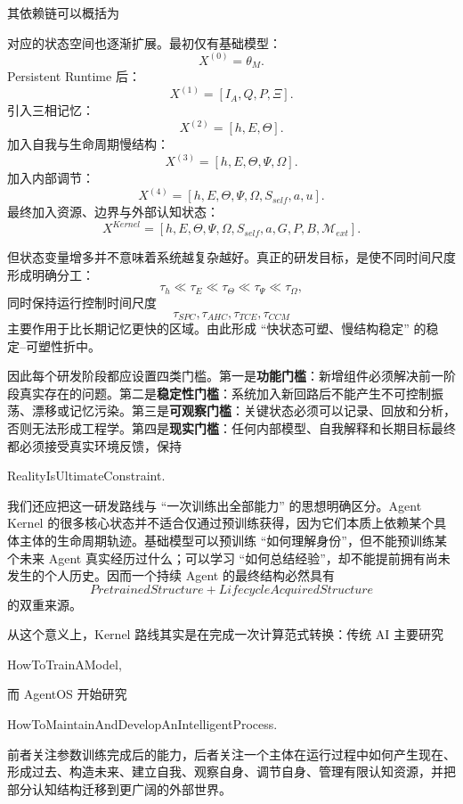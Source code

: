 其依赖链可以概括为
\begin{statementbox}
\centering
{}
\end{statementbox}

对应的状态空间也逐渐扩展。最初仅有基础模型：
\[
X^{(0)}=\theta_M.
\]
Persistent Runtime 后：
\[
X^{(1)}
=
[I_A,Q,P,\Xi].
\]
引入三相记忆：
\[
X^{(2)}
=
[h,E,\Theta].
\]
加入自我与生命周期慢结构：
\[
X^{(3)}
=
[h,E,\Theta,\Psi,\Omega].
\]
加入内部调节：
\[
X^{(4)}
=
[h,E,\Theta,\Psi,\Omega,S_{self},a,u].
\]
最终加入资源、边界与外部认知状态：
\[
X^{Kernel}
=
[
h,E,\Theta,\Psi,\Omega,
S_{self},a,
G,
P,
B,
\mathcal M_{ext}
].
\]

但状态变量增多并不意味着系统越复杂越好。真正的研发目标，是使不同时间尺度形成明确分工：
\[
\tau_h
\ll
\tau_E
\ll
\tau_\Theta
\ll
\tau_\Psi
\ll
\tau_\Omega,
\]
同时保持运行控制时间尺度
\[
\tau_{SPC},
\tau_{AHC},
\tau_{TCE},
\tau_{CCM}
\]
主要作用于比长期记忆更快的区域。由此形成 ``快状态可塑、慢结构稳定'' 的稳定--可塑性折中。

因此每个研发阶段都应设置四类门槛。第一是\textbf{功能门槛}：新增组件必须解决前一阶段真实存在的问题。第二是\textbf{稳定性门槛}：系统加入新回路后不能产生不可控制振荡、漂移或记忆污染。第三是\textbf{可观察门槛}：关键状态必须可以记录、回放和分析，否则无法形成工程学。第四是\textbf{现实门槛}：任何内部模型、自我解释和长期目标最终都必须接受真实环境反馈，保持
\begin{statementbox}
RealityIsUltimateConstraint.
\end{statementbox}

我们还应把这一研发路线与 ``一次训练出全部能力'' 的思想明确区分。Agent Kernel 的很多核心状态并不适合仅通过预训练获得，因为它们本质上依赖某个具体主体的生命周期轨迹。基础模型可以预训练 ``如何理解身份''，但不能预训练某个未来 Agent 真实经历过什么；可以学习 ``如何总结经验''，却不能提前拥有尚未发生的个人历史。因而一个持续 Agent 的最终结构必然具有
\[
PretrainedStructure
+
LifecycleAcquiredStructure
\]
的双重来源。

从这个意义上，Kernel 路线其实是在完成一次计算范式转换：传统 AI 主要研究
\begin{statementbox}
HowToTrainAModel,
\end{statementbox}
而 AgentOS 开始研究
\begin{statementbox}
HowToMaintainAndDevelopAnIntelligentProcess.
\end{statementbox}
前者关注参数训练完成后的能力，后者关注一个主体在运行过程中如何产生现在、形成过去、构造未来、建立自我、观察自身、调节自身、管理有限认知资源，并把部分认知结构迁移到更广阔的外部世界。

